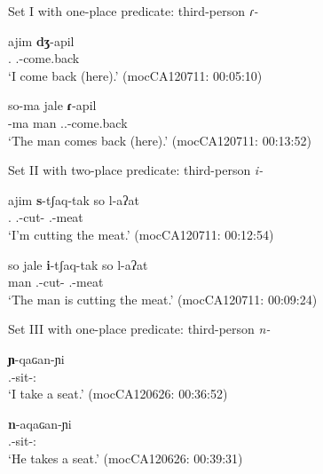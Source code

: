 \documentclass[12pt]{article}
\begin{document}
\begin{exe}
\ex\label{ex:comeback}
Set I with one-place predicate: third-person \textit{ɾ-}
\begin{xlist}
\ex 
	 \gll ajim \textbf{dʒ}-apil    \\
			        {\First\Sg.\Pron} {\First\Sg.\I}-come.back\\
	\trans `I come back (here).' \hfill (mocCA120711: 00:05:10)\label{ex:comeback1}
	
\ex 
	  \gll so-ma jale \textbf{ɾ}-apil \\
			      {\DetTwo}-ma man {\Third.\I.\Intr}-come.back\\
	  \trans `The man comes back (here).' \hfill (mocCA120711: 00:13:52)\label{ex:comeback3}
\end{xlist}
\end{exe}

\newpage
\begin{exe}
\ex\label{ex:cut}
Set II with two-place predicate: third-person \textit{i-}
\begin{xlist}
\ex 
	 \gll   ajim \textbf{s}-tʃaq-tak so l-aʔat \\
			        {\First\Sg.\Pron} {\First.\II}-cut-{\Prog} {\DetTwo} {\Third.\Poss}-meat\\
	\trans `I'm cutting the meat.' \hfill (mocCA120711: 00:12:54)\label{ex:cutfirst}
	
\ex 
	 \gll so jale \textbf{i}-tʃaq-tak so l-aʔat\\
			      {\DetTwo} man {\Third.\II}-cut-{\Prog} {\DetTwo} {\Third.\Poss}-meat\\
	 \trans `The man is cutting the meat.' \hfill  (mocCA120711: 00:09:24)\label{ex:cutfirst}
\end{xlist}
\end{exe}

\begin{exe}
\ex\label{ex:sit}
Set III with one-place predicate: third-person \textit{n-}
\begin{xlist}
\ex 
	 \gll \textbf{ɲ}-qaɢan-ɲi    \\
			        {\First.\III}-sit-{\Dir:\Down}\\
	\trans `I take a seat.' \hfill  (mocCA120626: 00:36:52) \label{ex:sitfirst}
	
\ex 
	  \gll \textbf{n}-aqaɢan-ɲi \\
			     {\Third.\III}-sit-{\Dir:\Down}  \\
	  \trans `He takes a seat.'
	  \hfill (mocCA120626: 00:39:31)\label{ex:sitthird}
\end{xlist}
\end{exe}
\end{document}
